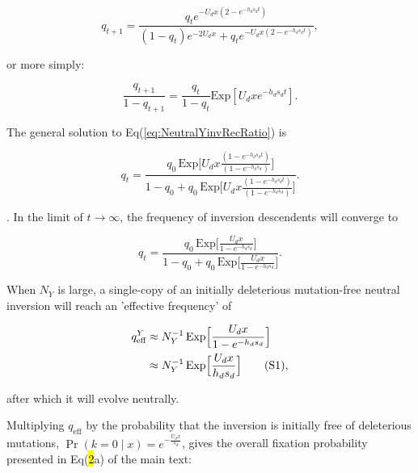 \documentclass[11pt]{article}
\newcommand\numberthis{\addtocounter{equation}{1}\tag{\theequation}}
\begin{document}
\begin{equation}\label{eq:NeutralYinvRec}
	q_{t+1} = \frac{ q_t e^{-U_d x(2 - e^{-h_d s_d t})} }{(1 - q_t) e^{-2 U_d x} + q_t e^{-U_d x(2 - e^{-h_d s_d t})}},
\end{equation} 

\noindent or more simply:

\begin{equation}\label{eq:NeutralYinvRecRatio}
	\frac{q_{t+1}}{1- q_{t+1}} = \frac{q_{t}}{1- q_{t}} \text{Exp}[U_d x e^{-h_d s_d t}].
\end{equation} 

\noindent The general solution to Eq(\ref{eq:NeutralYinvRecRatio}) is 

\begin{equation}\label{eq:NeutralYinvGenSol}
	q_{t} = \frac{q_{0} \, \text{Exp}\Bigg[ U_d x \frac{(1 - e^{-h_d s_d t})}{(1 - e^{-h_d s_d})} \Bigg]} {1 - q_{0} + q_0 \, \text{Exp}\Bigg[ U_d x \frac{(1 - e^{-h_d s_d t})}{(1 - e^{-h_d s_d})} \Bigg]}.
\end{equation} 

\noindent \citep[see][]{ConnallonOlito2021}. In the limit of $t \rightarrow \infty$, the frequency of inversion descendents will converge to 

\begin{equation}\label{eq:NeutralYinvGenSolLimit}
	q_{t} = \frac{q_{0} \, \text{Exp}\Big[ \frac{U_d x}{1 - e^{-h_d s_d} } \Big]} {1 - q_{0} + q_0 \, \text{Exp}\Big[ \frac{U_d x}{1 - e^{-h_d s_d} } \Big]}.
\end{equation} 

\noindent When $N_Y$ is large, a single-copy of an initially deleterious mutation-free neutral inversion will reach an 'effective frequency' of

\begin{align*}\label{eq:NeutralYinvQEff}
	q^Y_{\text{eff}} & \approx N^{-1}_Y \, \text{Exp}\Big[ \frac{U_d x}{1 - e^{-h_d s_d} } \Big] \\
	 &\approx N^{-1}_Y \, \text{Exp}\Big[ \frac{U_d x}{h_d s_d} \Big] \numberthis,
\end{align*} 

\noindent after which it will evolve neutrally. 

Multiplying $q_{\text{eff}}$ by the probability that the inversion is initially free of deleterious mutations, $\Pr(k = 0 \mid x) = e^{-\frac{U_d x}{s_d}}$, gives the overall fixation probability presented in Eq(\hl{2}a) of the main text:
\end{document}
